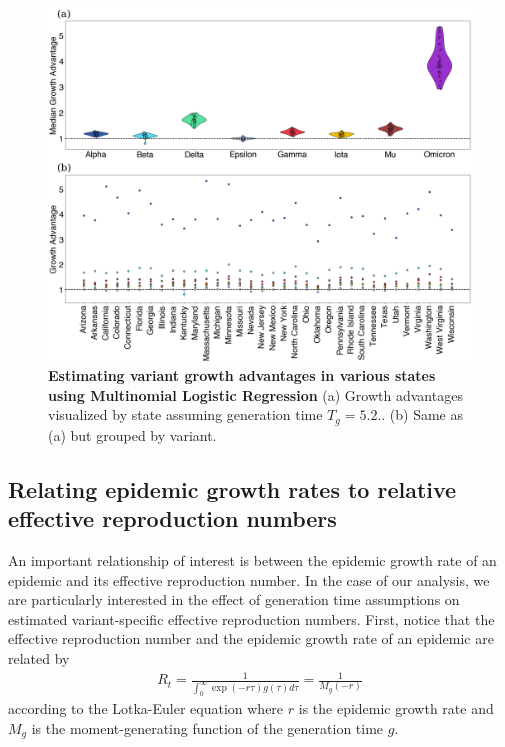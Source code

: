 \begin{figure}
  \centering
  \includegraphics[width=\linewidth]{figs/fig_MLR_growth_advantages_supp.png}
  \caption[\textbf{Estimating variant growth advantages in various states using Multinomial Logistic Regression}]{\textbf{Estimating variant growth advantages in various states using Multinomial Logistic Regression}
  (a) Growth advantages visualized by state assuming generation time $T_{g} = 5.2$..
  (b) Same as (a) but grouped by variant.}%
  \label{fig:MLR_growth_advantages}
\end{figure}

\newpage

\subsection*{Relating epidemic growth rates to relative effective reproduction numbers}

An important relationship of interest is between the epidemic growth rate of an epidemic and its effective reproduction number.
In the case of our analysis, we are particularly interested in the effect of generation time assumptions on estimated variant-specific effective reproduction numbers.
First, notice that the effective reproduction number and the epidemic growth rate of an epidemic are related by
\begin{align*}
R_{t} = \frac{1}{\int_{0}^{\infty} \exp(-r\tau)g(\tau)d\tau} = \frac{1}{M_{g}(-r)}
\end{align*}
according to the Lotka-Euler equation \cite{Wallinga2006} where $r$ is the epidemic growth rate and $M_{g}$ is the moment-generating function of the generation time $g$.

